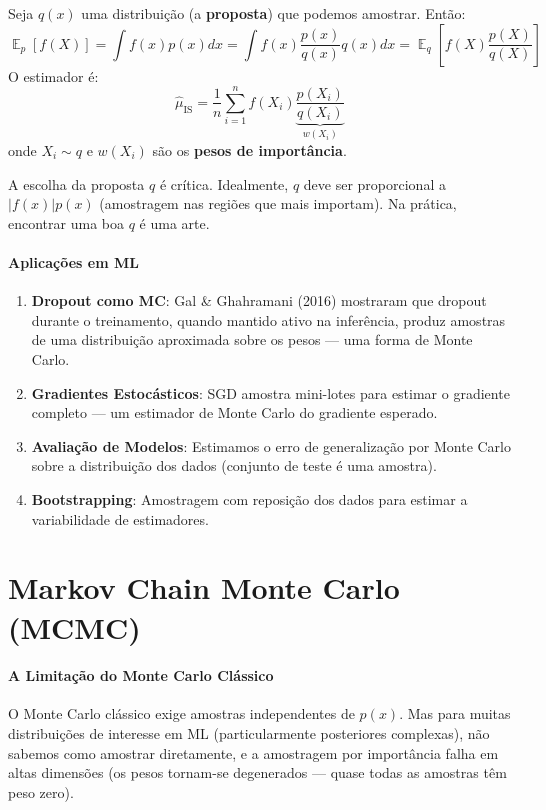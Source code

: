 \documentclass{tufte-handout}
\DeclareMathOperator{\E}{\mathbb{E}}
\begin{document}
\begin{defn}
    Seja $q(x)$ uma distribuição (a \textbf{proposta}) que podemos amostrar.
    Então:
    \[
    \E_{p}[f(X)] = \int f(x) p(x) dx = \int f(x) \frac{p(x)}{q(x)} q(x) dx = \E_{q}\left[f(X) \frac{p(X)}{q(X)}\right]
    \]
    O estimador é:
    \[
    \hat{\mu}_{\text{IS}} = \frac{1}{n} \sum_{i=1}^n f(X_i) \underbrace{\frac{p(X_i)}{q(X_i)}}_{w(X_i)}
    \]
    onde $X_i \sim q$ e $w(X_i)$ são os \textbf{pesos de importância}.
\end{defn}

A escolha da proposta $q$ é crítica. Idealmente, $q$ deve ser proporcional a $|f(x)| p(x)$
(amostragem nas regiões que mais importam). Na prática, encontrar uma boa $q$ é uma arte.

\paragraph{Aplicações em ML}

\begin{enumerate}
    \item \textbf{Dropout como MC}: Gal \& Ghahramani (2016) mostraram que dropout durante
    o treinamento, quando mantido ativo na inferência, produz amostras de uma distribuição
    aproximada sobre os pesos --- uma forma de Monte Carlo.
    \item \textbf{Gradientes Estocásticos}: SGD amostra mini-lotes para estimar o gradiente
    completo --- um estimador de Monte Carlo do gradiente esperado.
    \item \textbf{Avaliação de Modelos}: Estimamos o erro de generalização por Monte Carlo
    sobre a distribuição dos dados (conjunto de teste é uma amostra).
    \item \textbf{Bootstrapping}: Amostragem com reposição dos dados para estimar a
    variabilidade de estimadores.
\end{enumerate}

\section{Markov Chain Monte Carlo (MCMC)}
\label{sec:mcmc}

\paragraph{A Limitação do Monte Carlo Clássico}

O Monte Carlo clássico exige amostras independentes de $p(x)$. Mas para muitas
distribuições de interesse em ML (particularmente posteriores complexas), não sabemos
como amostrar diretamente, e a amostragem por importância falha em altas dimensões
(os pesos tornam-se degenerados --- quase todas as amostras têm peso zero).
\end{document}
